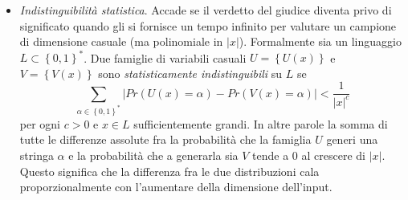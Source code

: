 \documentclass{article}
\theoremstyle{definition}
\begin{document}
\begin{itemize}
    \item \emph{Indistinguibilità statistica}. 
    Accade se il verdetto del giudice diventa privo di significato quando gli si fornisce un tempo infinito per valutare un campione di dimensione casuale (ma polinomiale in $|x|$).
    Formalmente sia un linguaggio $L \subset \left\{ 0, 1 \right\}^*$. Due famiglie di variabili casuali $U = \left\{U(x)\right\}$ e $V = \left\{V(x)\right\}$ sono \emph{statisticamente indistinguibili} su $L$ se 
    \begin{equation*}
        \sum_{\alpha \in \left\{0,1\right\}^*} \left| Pr(U(x) = \alpha) - Pr(V(x) = \alpha)\right| < \frac{1}{|x|^c}
    \end{equation*}
    per ogni $c > 0$ e $x \in L$ sufficientemente grandi.
    In altre parole la somma di tutte le differenze assolute fra la probabilità che la famiglia $U$ generi una stringa $\alpha$ e la probabilità che a generarla sia $V$ tende a 0 al crescere di $|x|$.
    Questo significa che la differenza fra le due distribuzioni cala proporzionalmente con l'aumentare della dimensione dell'input.
    

\end{itemize}
\end{document}
